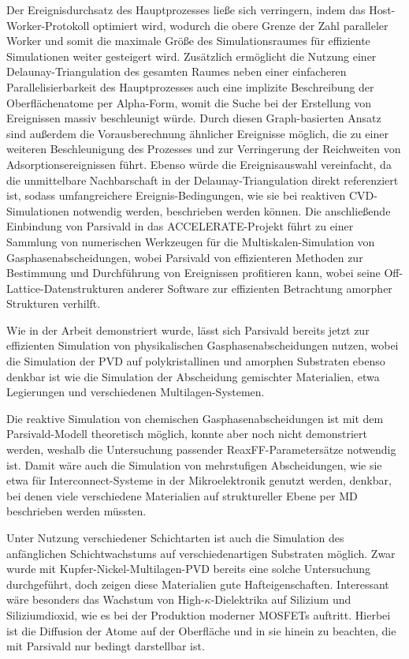 Der Ereignisdurchsatz des Hauptprozesses ließe sich verringern, indem das Host-Worker-Protokoll optimiert wird, wodurch die obere Grenze der Zahl paralleler Worker und somit die maximale Größe des Simulationsraumes für effiziente Simulationen weiter gesteigert wird.
Zusätzlich ermöglicht die Nutzung einer Delaunay-Triangulation des gesamten Raumes neben einer einfacheren Parallelisierbarkeit des Hauptprozesses auch eine implizite Beschreibung der Oberflächenatome per Alpha-Form, womit die Suche bei der Erstellung von Ereignissen massiv beschleunigt würde.
Durch diesen Graph-basierten Ansatz sind außerdem die Vorausberechnung ähnlicher Ereignisse möglich, die zu einer weiteren Beschleunigung des Prozesses und zur Verringerung der Reichweiten von Adsorptionsereignissen führt.
Ebenso würde die Ereignisauswahl vereinfacht, da die unmittelbare Nachbarschaft in der Delaunay-Triangulation direkt referenziert ist, sodass umfangreichere Ereignis-Bedingungen, wie sie bei reaktiven CVD-Simulationen notwendig werden, beschrieben werden können.
Die anschließende Einbindung von Parsivald in das ACCELERATE-Projekt führt zu einer Sammlung von numerischen Werkzeugen für die Multiskalen-Simulation von Gasphasenabscheidungen, wobei Parsivald von effizienteren Methoden zur Bestimmung und Durchführung von Ereignissen profitieren kann, wobei seine Off-Lattice-Datenstrukturen anderer Software zur effizienten Betrachtung amorpher Strukturen verhilft.

Wie in der Arbeit demonstriert wurde, lässt sich Parsivald bereits jetzt zur effizienten Simulation von physikalischen Gasphasenabscheidungen nutzen, wobei die Simulation der PVD auf polykristallinen und amorphen Substraten ebenso denkbar ist wie die Simulation der Abscheidung gemischter Materialien, etwa Legierungen und verschiedenen Multilagen-Systemen.

Die reaktive Simulation von chemischen Gasphasenabscheidungen ist mit dem Parsivald-Modell theoretisch möglich, konnte aber noch nicht demonstriert werden, weshalb die Untersuchung passender ReaxFF-Parametersätze notwendig ist.
Damit wäre auch die Simulation von mehrstufigen Abscheidungen, wie sie etwa für Interconnect-Systeme in der Mikroelektronik genutzt werden, denkbar, bei denen viele verschiedene Materialien auf struktureller Ebene per MD beschrieben werden müssten.

Unter Nutzung verschiedener Schichtarten ist auch die Simulation des anfänglichen Schichtwachstums auf verschiedenartigen Substraten möglich.
Zwar wurde mit Kupfer-Nickel-Multi\-lagen-PVD bereits eine solche Untersuchung durchgeführt, doch zeigen diese Materialien gute Hafteigenschaften.
Interessant wäre besonders das Wachstum von High-$\kappa$-Dielektrika auf Silizium und Siliziumdioxid, wie es bei der Produktion moderner MOSFETs auftritt.
Hierbei ist die Diffusion der Atome auf der Oberfläche und in sie hinein zu beachten, die mit Parsivald nur bedingt darstellbar ist.

